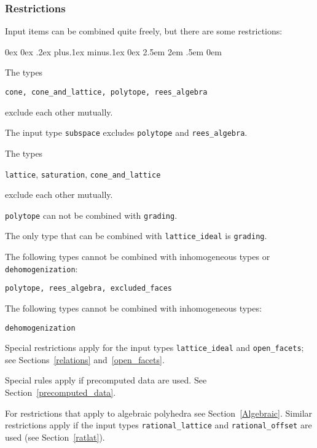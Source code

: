\documentclass[12pt,a4paper]{scrartcl}
\newcounter{listi}
\newcommand{\stdli}{ \topsep0ex \partopsep0ex %
\parsep.2ex plus.1ex minus.1ex \itemsep0ex%
\leftmargin2.5em \labelwidth2em \labelsep.5em \rightmargin0em}%
\newenvironment{arab}{\begin{list}{\textup{(\arabic{listi})}}%
	{\usecounter{listi}\stdli}}{\end{list}}
\theoremstyle{definition}
\def\ttt{\texttt}
\begin{document}
\subsubsection{Restrictions}

Input items can be combined quite freely, but there are some restrictions:

\begin{arab}
	\item The types
	\begin{center}
		\ttt {cone, cone\_and\_lattice, polytope, rees\_algebra}
	\end{center}
	exclude each other mutually.
	\item The input type \verb|subspace| excludes \verb|polytope| and \verb|rees_algebra|.
	\item The types
	\begin{center}
		\ttt {lattice}, \ttt{saturation}, \ttt{cone\_and\_lattice}
	\end{center}
	exclude each other mutually.
	\item \verb|polytope| can not be combined with \verb|grading|.
	\item The only type that can be combined with \ttt{lattice\_ideal} is \ttt{grading}.
	\item The following types cannot be combined with inhomogeneous types or \verb|dehomogenization|:
	\begin{center}
		\ttt{polytope, rees\_algebra, excluded\_faces}
	\end{center}
	\item The following types cannot be combined with inhomogeneous types:
	\begin{center}
		\ttt{dehomogenization}
	\end{center}
	
	\item Special restrictions apply for the input types \verb|lattice_ideal| and \verb|open_facets|; see Sections~\ref{relations} and~\ref{open_facets}.
	
	\item Special rules apply if precomputed data are used. See Section~\ref{precomputed_data}.
	
	\item For restrictions that apply to algebraic polyhedra see Section~\ref{Algebraic}. Similar restrictions apply if the input types \ttt{rational\_lattice} and \ttt{rational\_offset} are used (see Section~\ref{ratlat}).
\end{arab}
\end{document}
